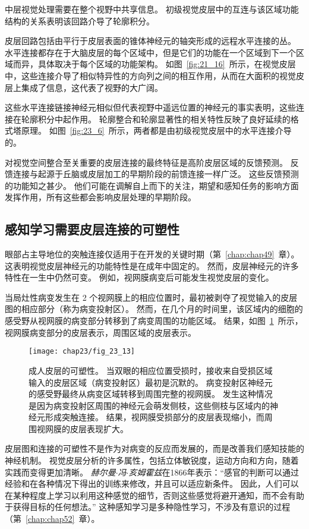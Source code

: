中层视觉处理需要在整个视野中共享信息。
初级视觉皮层中的互连与该区域功能结构的关系表明该回路介导了轮廓积分。


皮层回路包括由平行于皮层表面的锥体神经元的轴突形成的远程水平连接的丛。
水平连接都存在于大脑皮层的每个区域中，但是它们的功能在一个区域到下一个区域而异，具体取决于每个区域的功能架构。
如图~\ref{fig:21_16}~所示，在视觉皮层中，这些连接介导了相似特异性的方向列之间的相互作用，从而在大面积的视觉皮层上集成了信息，这代表了视野的大广阔。


这些水平连接链接神经元相似但代表视野中遥远位置的神经元的事实表明，这些连接在轮廓积分中起作用。
轮廓整合和轮廓显著性的相关特性反映了良好延续的格式塔原理。
如图~\ref{fig:23_6}~所示，两者都是由初级视觉皮层中的水平连接介导的。


对视觉空间整合至关重要的皮层连接的最终特征是高阶皮层区域的反馈预测。
反馈连接与起源于丘脑或皮层加工的早期阶段的前馈连接一样广泛。
这些反馈预测的功能知之甚少。
他们可能在调解自上而下的关注，期望和感知任务的影响方面发挥作用，所有这些都会影响皮层处理的早期阶段。



\subsection{感知学习需要皮层连接的可塑性}

眼部占主导地位的突触连接仅适用于在开发的关键时期（第~\ref{chap:chap49}~章）。
这表明视觉皮层神经元的功能特性是在成年中固定的。
然而，皮层神经元的许多特性在一生中仍然可变。
例如，视网膜病变后可能发生视觉皮层的变化。


当局灶性病变发生在 2 个视网膜上的相应位置时，最初被剥夺了视觉输入的皮层图的相应部分（称为病变投射区）。
然而，在几个月的时间里，该区域内的细胞的感受野从视网膜的病变部分转移到了病变周围的功能区域。
结果，如图~\ref{fig:23_13}~所示，视网膜病变部分的皮层表示，周围区域的皮层表示。


\begin{figure}[htbp]
	\centering
	\texttt{[image: chap23/fig\_23\_13]}
	\caption{成人皮层的可塑性。
		当双眼的相应位置受损时，接收来自受损区域输入的皮层区域（病变投射区）最初是沉默的。
		病变投射区神经元的感受野最终从病变区域转移到周围完整的视网膜。
		发生这种情况是因为病变投射区周围的神经元会萌发侧枝，这些侧枝与区域内的神经元形成突触连接。
		结果，视网膜受损部分的皮层表现缩小，而周围视网膜的皮层表现扩大。}
	\label{fig:23_13}
\end{figure}


皮层图和连接的可塑性不是作为对病变的反应而发展的，而是改善我们感知技能的神经机制。
视觉皮层分析的许多属性，包括立体敏锐度，运动方向和方向，随着实践而变得更加清晰。
\textit{赫尔曼$\cdot$冯$\cdot$亥姆霍兹}在1866年表示：“感官的判断可以通过经验和在各种情况下得出的训练来修改，并且可以适应新条件。
因此，人们可以在某种程度上学习以利用这种感觉的细节，否则这些感觉将避开通知，而不会有助于获得目标的任何想法。” 
这种感知学习是多种隐性学习，不涉及有意识的过程（第~\ref{chap:chap52}~章）。


